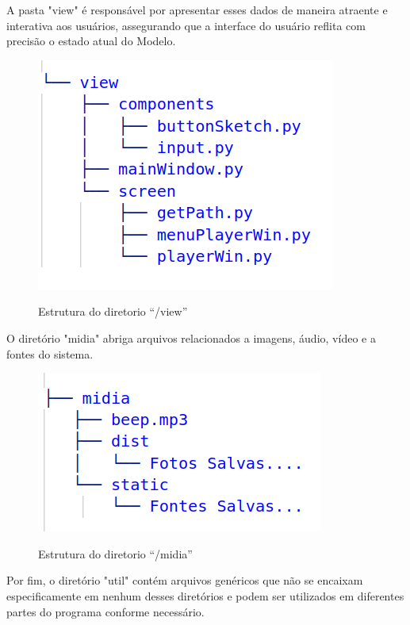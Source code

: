 A pasta "view" é responsável por apresentar esses dados de maneira atraente e interativa aos usuários, assegurando que a interface do usuário reflita com precisão o estado atual do Modelo.

\begin{figure}[H]
	\centering
	\caption{Estrutura do diretorio ``/view''}
	\includegraphics[scale=0.5]{figuras/diretorios/view.png}
	\label{fig:view}
\end{figure}


O diretório "midia" abriga arquivos relacionados a imagens, áudio, vídeo e a fontes do sistema. 
\begin{figure}[H]
	\centering
	\caption{Estrutura do diretorio ``/midia''}
	\includegraphics[scale=0.5]{figuras/diretorios/midia.png}
	\label{fig:midia}
\end{figure}

Por fim, o diretório "util" contém arquivos genéricos que não se encaixam especificamente em nenhum desses diretórios e podem ser utilizados em diferentes partes do programa conforme necessário.

